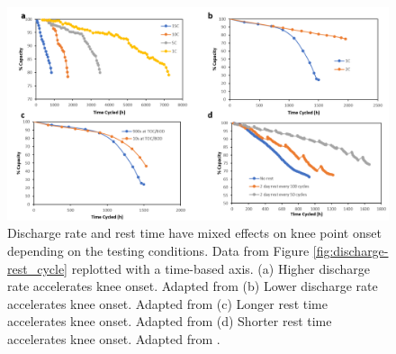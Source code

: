 \documentclass[journal=jpcl, manuscript=article, layout=onecolumn]{achemso}
\begin{document}
\begin{figure}[ht]
\centering
\includegraphics[scale = 1.0]{figures/Discharge-rest_time.png}
\caption{Discharge rate and rest time have mixed effects on knee point onset depending on the testing conditions. Data from Figure \ref{fig:discharge-rest_cycle} replotted with a time-based axis. (a) Higher discharge rate accelerates knee onset. Adapted from \cite{omar_lithium_2014} (b) Lower discharge rate accelerates knee onset. Adapted from \cite{keil_linear_2019} (c) Longer rest time accelerates knee onset. Adapted from \cite{keil_linear_2019} (d) Shorter rest time accelerates knee onset. Adapted from \cite{epding_investigation_2019}.}
\label{fig:discharge-rest_time}
\end{figure}

% 

\end{document}
